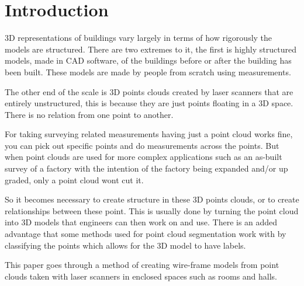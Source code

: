 

\section{Introduction}



3D representations of buildings vary largely in terms of how rigorously the models are structured. There are two extremes to it, the first is highly structured models, made in CAD software, of the buildings before or after the building has been built. These models are made by people from scratch using measurements.

The other end of the scale is 3D points clouds created by laser scanners that are entirely unstructured, this is because they are just points floating in a 3D space. There is no relation from one point to another.

For taking surveying related measurements having just a point cloud works fine, you can pick out specific points and do measurements across the points. But when point clouds are used for more complex applications such as an as-built survey of a factory with the intention of the factory being expanded and/or up graded, only a point cloud wont cut it.

So it becomes necessary to create structure in these 3D points clouds, or to create relationships between these point. This is usually done by turning the point cloud into 3D models that engineers can then work on and use. There is an added advantage that some methods used for point cloud segmentation work with by classifying the points which allows for the 3D model to have labels.

This paper goes through a method of creating wire-frame models from point clouds taken with laser scanners in enclosed spaces such as rooms and halls. 








